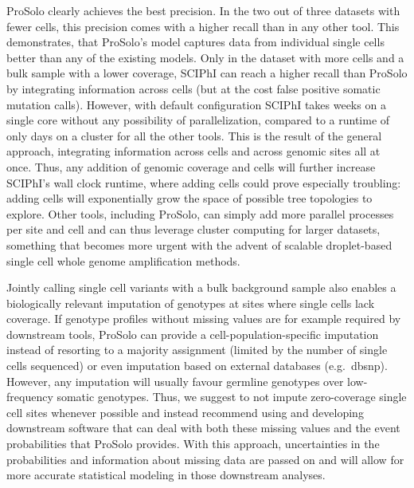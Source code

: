 \documentclass[12pt,inline]{wlscirep}
\begin{document}
ProSolo clearly achieves the best precision.
In the two out of three datasets with fewer cells, this precision comes with a higher recall than in any other tool.
This demonstrates, that ProSolo's model captures data from individual single cells better than any of the existing models.
Only in the dataset with more cells and a bulk sample with a lower coverage, SCIPhI can reach a higher recall than ProSolo by integrating information across cells (but at the cost false positive somatic mutation calls).
However, with default configuration SCIPhI takes weeks on a single core without any possibility of parallelization, compared to a runtime of only days on a cluster for all the other tools.
This is the result of the general approach, integrating information across cells and across genomic sites all at once.
Thus, any addition of genomic coverage and cells will further increase SCIPhI's wall clock runtime, where adding cells could prove especially troubling: adding cells will exponentially grow the space of possible tree topologies to explore.
Other tools, including ProSolo, can simply add more parallel processes per site and cell and can thus leverage cluster computing for larger datasets, something that becomes more urgent with the advent of scalable droplet-based single cell whole genome amplification methods\cite{lahnemann_eleven_2020}.

Jointly calling single cell variants with a bulk background sample also enables a biologically relevant imputation of genotypes at sites where single cells lack coverage.
If genotype profiles without missing values are for example required by downstream tools, ProSolo can provide a cell-population-specific imputation instead of resorting to a majority assignment (limited by the number of single cells sequenced) or even imputation based on external databases (e.g.~dbsnp).
However, any imputation will usually favour germline genotypes over low-frequency somatic genotypes.
Thus, we suggest to not impute zero-coverage single cell sites whenever possible and instead recommend using and developing downstream software that can deal with both these missing values and the event probabilities that ProSolo provides.
With this approach, uncertainties in the probabilities and information about missing data are passed on and will allow for more accurate statistical modeling in those downstream analyses.
\end{document}
